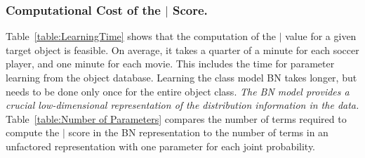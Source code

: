 \documentclass[conference]{IEEEtran}
\begin{document}
						\subsubsection{Computational Cost of the $\mid$ Score.}
%						
%						
						Table~\ref{table:LearningTime} shows that the computation of the $\mid$ value for a given target object is feasible. On average, it takes a quarter of a minute for each soccer player, and one minute for each movie. This includes the time for parameter learning from the object database.
Learning the class model BN takes longer, but needs to be done only once for the entire object class. 
						{\em The BN model 
						provides a crucial %
 low-dimensional representation of the 
						distribution information in the data.} Table~\ref{table:Number of Parameters} compares the number of terms required to compute the $\mid$ score in the BN representation to the number of terms in an unfactored representation with one parameter for each joint probability.
						
\end{document}
